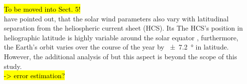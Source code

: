 \hl{To be moved into Sect. 5!}\\
\citet{Bruno1986,Balogh1999} have pointed out, that the solar wind parameters also vary with latitudinal separation from the heliospheric current sheet (HCS). Its The HCS’s position in heliographic latitude is highly variable around the solar equator \citep{Schwenn1990}, furthermore, the Earth’s orbit varies over the course of the year by \SI{+-7.2}{\degree} in latitude. However, the additional analysis of but this aspect is beyond the scope of this study.\\	%
\hl{-> error estimation?}\\


